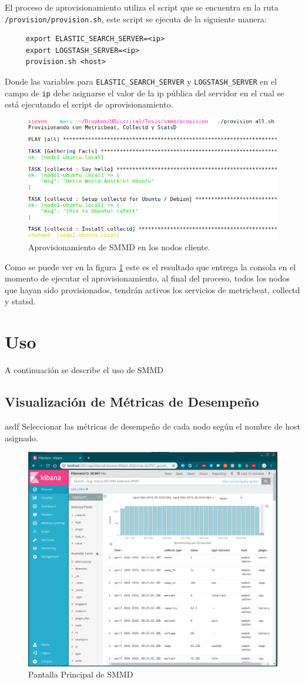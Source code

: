 \newpage

El proceso de aprovisionamiento utiliza el script que se encuentra en la ruta \texttt{/provision/provision.sh}, este script se ejecuta de la siguiente manera:

\begin{verbatim}
     export ELASTIC_SEARCH_SERVER=<ip>
     export LOGSTASH_SERVER=<ip>
     provision.sh <host>
\end{verbatim}

Donde las variables para \texttt{ELASTIC\_SEARCH\_SERVER} y \texttt{LOGSTASH\_SERVER} en el campo de \texttt{ip} debe asignarse el valor de la ip pública del servidor en el cual se está ejecutando el script de aprovisionamiento.

\begin{figure}[h]
 \centering
  \includegraphics[width=0.6\linewidth]{./imagenes/provision_all.png}
  \caption{Aprovisionamiento de SMMD en los nodos cliente.}
  \label{fig:aprovisionamiento-nodos}
\end{figure}
Como se puede ver en la figura \ref{fig:aprovisionamiento-nodos} este es el resultado que entrega la consola en el momento de ejecutar el aprovisionamiento, al final del proceso, todos los nodos que hayan sido provisionados, tendrán activos los servicios de metricbeat, collectd y statsd.
\clearpage

\section{Uso}
A continuación se describe el uso de SMMD
\subsection{Visualización de Métricas de Desempeño}
asdf
Seleccionar las métricas de desempeño de cada nodo según el nombre de host asignado.
\begin{figure}[h]
 \centering
  \includegraphics[width=0.6\linewidth]{./imagenes/kibana-home.png}
  \caption{Pantalla Principal de SMMD}
  \label{fig:home-smmd}
\end{figure}

